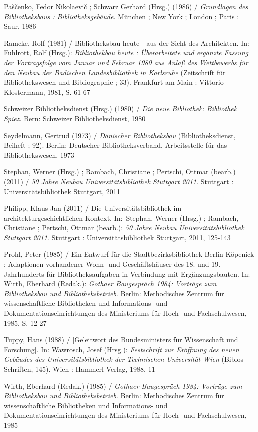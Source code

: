 \documentclass[a4paper,
fontsize=11pt,
oneside,
numbers=noperiodatend,
parskip=half-,
bibliography=totoc,
final
]{scrartcl}
\begin{document}
Paščenko, Fedor Nikolaevič ; Schwarz Gerhard (Hrsg.) (1986) /
\emph{Grundlagen des Bibliotheksbaus : Bibliotheksgebäude}. München ;
New York ; London ; Paris : Saur, 1986

Ramcke, Rolf (1981) / Bibliotheksbau heute - aus der Sicht des
Architekten. In: Fuhlrott, Rolf (Hrsg.): \emph{Bibliothekbau heute :
Überarbeitete und ergänzte Fassung der Vortragsfolge vom Januar und
Februar 1980 aus Anlaß des Wettbewerbs für den Neubau der Badischen
Landesbibliothek in Karlsruhe} (Zeitschrift für Bibliothekswesen und
Bibliographie ; 33). Frankfurt am Main : Vittorio Klostermann, 1981, S.
61-67

Schweizer Bibliotheksdienst (Hrsg.) (1980) / \emph{Die neue Bibliothek:
Bibliothek Spiez}. Bern: Schweizer Bibliotheksdienst, 1980

Seydelmann, Gertrud (1973) / \emph{Dänischer Bibliotheksbau}
(Bibliotheksdienst, Beiheft ; 92). Berlin: Deutscher Bibliotheksverband,
Arbeitsstelle für das Bibliothekswesen, 1973

Stephan, Werner (Hrsg.) ; Rambach, Christiane ; Pertschi, Ottmar
(bearb.) (2011) / \emph{50 Jahre Neubau Universitätsbibliothek Stuttgart
2011}. Stuttgart : Universitätsbibliothek Stuttgart, 2011

Philipp, Klaus Jan (2011) / Die Universitätsbibliothek im
architekturgeschichtlichen Kontext. In:~Stephan, Werner (Hrsg.) ;
Rambach, Christiane ; Pertschi, Ottmar (bearb.): \emph{50 Jahre Neubau
Universitätsbibliothek Stuttgart 2011}. Stuttgart :
Universitätsbibliothek Stuttgart, 2011, 125-143

Prohl, Peter (1985) / Ein Entwurf für die Stadtbezirksbibliothek
Berlin-Köpenick : Adaptionen vorhandener Wohn- und Geschäftshäuser des
18. und 19. Jahrhunderts für Bibliotheksaufgaben in Verbindung mit
Ergänzungsbauten. In: Wirth, Eberhard (Redak.): \emph{Gothaer
Baugespräch 1984: Vorträge zum Bibliotheksbau und Bibliotheksbetrieb}.
Berlin: Methodisches Zentrum für wissenschaftliche Bibliotheken und
Informations- und Dokumentationseinrichtungen des Ministeriums für Hoch-
und Fachschulwesen, 1985, S. 12-27

Tuppy, Hans (1988) / {[}Geleitwort des Bundesministers für Wissenschaft
und Forschung{]}. In: Wawrosch, Josef (Hrsg.): \emph{Festschrift zur
Eröffnung des neuen Gebäudes des Universitätsbibliothek der Technischen
Universität Wien} (Biblos-Schriften, 145). Wien : Hammerl-Verlag, 1988,
11

Wirth, Eberhard (Redak.) (1985) / \emph{Gothaer Baugespräch 1984:
Vorträge zum Bibliotheksbau und Bibliotheksbetrieb}. Berlin:
Methodisches Zentrum für wissenschaftliche Bibliotheken und
Informations- und Dokumentationseinrichtungen des Ministeriums für Hoch-
und Fachschulwesen, 1985
\end{document}
